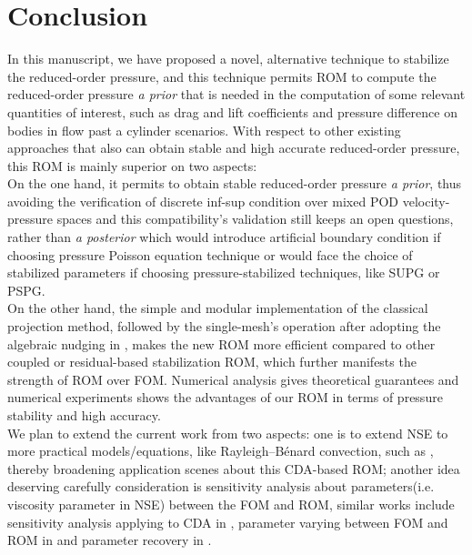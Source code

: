 \documentclass[10pt,twoside,openany,UTF8,CJK]{article}
\begin{document}
	\section{Conclusion}\label{section-5}
	In this manuscript, we have proposed a novel, alternative technique to stabilize the reduced-order pressure, and this technique permits ROM to compute the reduced-order pressure \textit{a prior} that is needed in the computation of some relevant quantities of interest, such as drag and lift coefficients and pressure difference on bodies in flow past a cylinder scenarios. With respect to other existing approaches that also can obtain stable and high accurate reduced-order pressure, this ROM is mainly superior on two aspects: \\  
	\indent On the one hand, it permits to obtain stable reduced-order pressure \textit{a prior}, thus avoiding the verification of discrete inf-sup condition over mixed POD velocity-pressure spaces and this compatibility’s validation still keeps an open questions, rather than \textit{a posterior} which would introduce artificial boundary condition if choosing pressure Poisson equation technique or would face the choice of stabilized parameters if choosing pressure-stabilized techniques, like SUPG or PSPG. \\  
	\indent On the other hand, the simple and modular implementation of the classical projection method, followed by the single-mesh’s operation after adopting the algebraic nudging in \cite{CDA-2021-NMPDE}, makes the new ROM more efficient compared to other coupled or residual-based stabilization ROM, which further manifests the strength of ROM over FOM. Numerical analysis gives theoretical guarantees and numerical experiments shows the advantages of our ROM in terms of pressure stability and high accuracy.  \\
	\indent We plan to extend the current work from two aspects: one is to extend NSE to more practical models/equations, like Rayleigh–Bénard convection, such as \cite{RBC-POD-ROM-2019-AMM,RBC-POD-ROM-2020-ICHMT}, thereby broadening application scenes about this CDA-based ROM; another idea deserving carefully consideration is sensitivity analysis about parameters(i.e. viscosity parameter in NSE) between the FOM and ROM, similar works include sensitivity analysis applying to CDA in \cite{CDA-SensAnal-2021-JNS}, parameter varying between FOM and ROM in \cite{ParaVary-2022-CMAME} and parameter recovery in \cite{ParaRecov-2020-SISC}.
	
	\appendix		
\end{document}
